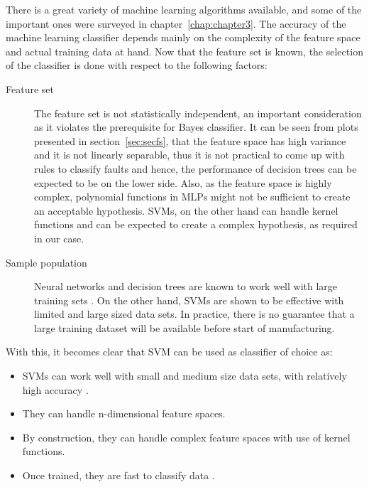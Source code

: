 There is a great variety of machine learning algorithms available, and some of the important ones were surveyed in chapter~\ref{chap:chapter3}. The accuracy of the machine learning classifier depends mainly on the complexity of the feature space and actual training data at hand. Now that the feature set is known, the selection of the classifier is done with respect to the following factors:

\begin{description}
  \item[Feature set] The feature set is not statistically independent, an important consideration as it violates the prerequisite for Bayes classifier. It can be seen from plots presented in section~\ref{sec:secfs}, that the feature space has high variance and it is not linearly separable, thus it is not practical to come up with rules to classify faults and hence, the performance of decision trees can be expected to be on the lower side. Also, as the feature space is highly complex, polynomial functions in MLPs might not be sufficient to create an acceptable hypothesis. SVMs, on the other hand can handle kernel functions and can be expected to create a complex hypothesis, as required in our case.

  \item[Sample population] Neural networks and decision trees are known to work well with large training sets \cite{DeFries2000,Tanwani2009}. On the other hand, SVMs are shown to be effective with limited and large sized data sets\cite{Koggalage2004}. In practice, there is no guarantee that a large training dataset will be available before start of manufacturing.
\end{description}

With this, it becomes clear that SVM can be used as classifier of choice as:
\begin{itemize}
  \item SVMs can work well with small and medium size data sets, with relatively high accuracy \cite{Koggalage2004, Matlab2014}.
  \item They can handle n-dimensional feature spaces.
  \item By construction, they can handle complex feature spaces with use of kernel functions.
  \item Once trained, they are fast to classify data .
\end{itemize}
